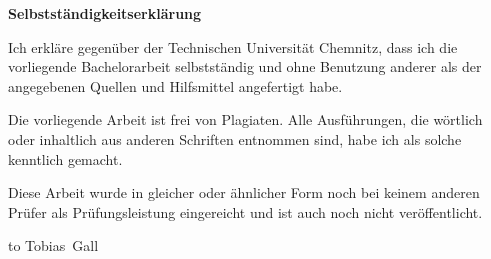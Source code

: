 \centerline{\textbf{\Large Selbstständigkeitserklärung}}

\bigskip

Ich erkläre gegenüber der Technischen Universität Chemnitz, dass ich die
vorliegende Bachelorarbeit selbstständig und ohne Benutzung anderer als der
angegebenen Quellen und Hilfsmittel angefertigt habe.

Die vorliegende Arbeit ist frei von Plagiaten. Alle Ausführungen, die wörtlich
oder inhaltlich aus anderen Schriften entnommen sind, habe ich als solche
kenntlich gemacht.

Diese Arbeit wurde in gleicher oder ähnlicher Form noch bei keinem anderen
Prüfer als Prüfungsleistung eingereicht und ist auch noch nicht veröffentlicht.

\vspace*{8ex}

\begin{flushright}
\begin{minipage}{5cm}
\footnotesize
\vbox{\hbox to \hsize{\dotfill}\hbox{\hspace{1em}Tobias Gall}}
\end{minipage}
\end{flushright}
